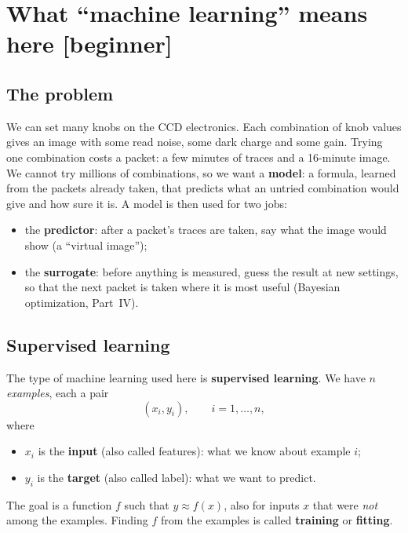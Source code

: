 \documentclass[11pt]{article}
\newcommand{\level}[1]{\hfill{\normalfont\small\color{black!60}[#1]}}
\begin{document}
\section{What ``machine learning'' means here \level{beginner}}
\label{sec:problem}

\subsection{The problem}
\begin{idea}
We can set many knobs on the CCD electronics. Each combination of knob values gives an image with some read noise, some dark
charge and some gain. Trying one combination costs a packet: a few minutes of traces and a 16-minute image. We cannot try
millions of combinations, so we want a \textbf{model}: a formula, learned from the packets already taken, that predicts what
an untried combination would give and how sure it is. A model is then used for two jobs:
\begin{itemize}
\item the \textbf{predictor}: after a packet's traces are taken, say what the image would show (a ``virtual image'');
\item the \textbf{surrogate}: before anything is measured, guess the result at new settings, so that the next packet is
  taken where it is most useful (Bayesian optimization, Part~IV).
\end{itemize}
\end{idea}

\subsection{Supervised learning}
The type of machine learning used here is \textbf{supervised learning}. We have $n$ \emph{examples}, each a pair
\begin{equation}
(x_i, y_i),\qquad i = 1, \dots, n,
\end{equation}
where
\begin{itemize}
\item $x_i$ is the \textbf{input} (also called features): what we know about example $i$;
\item $y_i$ is the \textbf{target} (also called label): what we want to predict.
\end{itemize}
The goal is a function $f$ such that $y \approx f(x)$, also for inputs $x$ that were \emph{not} among the examples. Finding $f$
from the examples is called \textbf{training} or \textbf{fitting}.
\end{document}
